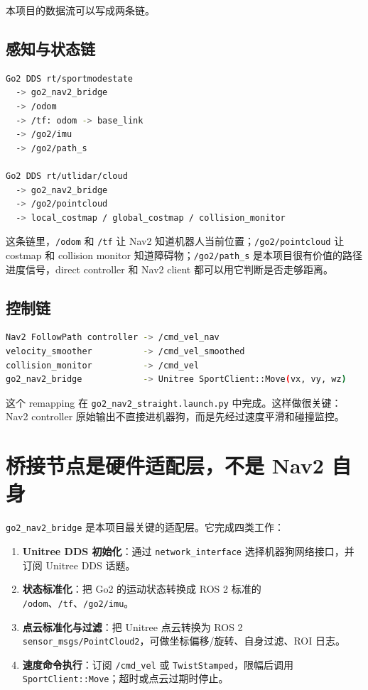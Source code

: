 \documentclass[UTF8,11pt,a4paper,openany]{ctexrep}
\newcommand{\code}[1]{\nolinkurl{#1}}
\newcommand{\topic}[1]{\nolinkurl{#1}}
\newcommand{\param}[1]{\nolinkurl{#1}}
\newcommand{\file}[1]{\nolinkurl{#1}}
\newcommand{\pkg}[1]{\nolinkurl{#1}}
\begin{document}
本项目的数据流可以写成两条链。

\subsection{感知与状态链}

\begin{lstlisting}[language=bash]
Go2 DDS rt/sportmodestate
  -> go2_nav2_bridge
  -> /odom
  -> /tf: odom -> base_link
  -> /go2/imu
  -> /go2/path_s

Go2 DDS rt/utlidar/cloud
  -> go2_nav2_bridge
  -> /go2/pointcloud
  -> local_costmap / global_costmap / collision_monitor
\end{lstlisting}

这条链里，\topic{/odom} 和 \topic{/tf} 让 Nav2 知道机器人当前位置；\topic{/go2/pointcloud} 让 costmap 和 collision monitor 知道障碍物；\topic{/go2/path_s} 是本项目很有价值的路径进度信号，direct controller 和 Nav2 client 都可以用它判断是否走够距离。

\subsection{控制链}

\begin{lstlisting}[language=bash]
Nav2 FollowPath controller -> /cmd_vel_nav
velocity_smoother          -> /cmd_vel_smoothed
collision_monitor          -> /cmd_vel
go2_nav2_bridge            -> Unitree SportClient::Move(vx, vy, wz)
\end{lstlisting}

这个 remapping 在 \file{go2_nav2_straight.launch.py} 中完成。这样做很关键：Nav2 controller 原始输出不直接进机器狗，而是先经过速度平滑和碰撞监控。

\section{桥接节点是硬件适配层，不是 Nav2 自身}

\pkg{go2_nav2_bridge} 是本项目最关键的适配层。它完成四类工作：

\begin{enumerate}
  \item \textbf{Unitree DDS 初始化}：通过 \param{network_interface} 选择机器狗网络接口，并订阅 Unitree DDS 话题。
  \item \textbf{状态标准化}：把 Go2 的运动状态转换成 ROS 2 标准的 \topic{/odom}、\topic{/tf}、\topic{/go2/imu}。
  \item \textbf{点云标准化与过滤}：把 Unitree 点云转换为 ROS 2 \code{sensor_msgs/PointCloud2}，可做坐标偏移/旋转、自身过滤、ROI 日志。
  \item \textbf{速度命令执行}：订阅 \topic{/cmd_vel} 或 \code{TwistStamped}，限幅后调用 \code{SportClient::Move}；超时或点云过期时停止。
\end{enumerate}
\end{document}
